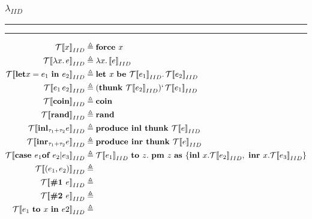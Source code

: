 \documentclass{article}
\DeclareMathOperator*\rrb{]\!]}
\begin{document}
\subsubsection*{$\lambda_{IID}$}
\hrule\hrule
\medskip
	\begin{equation*}
		\begin{split}
			\mathcal{T} [\![x{\rrb}_{IID} &\triangleq 
			\text{\bf force } x \\
			\mathcal{T} [\![\lambda x.\, e{\rrb}_{IID} &\triangleq 
			\lambda x.\, \mathcal[\![ e {\rrb}_{IID} \\
			\mathcal{T} [\![\text{\bf let} x = e_1 \text{ \bf in } e_2{\rrb}_{IID} &\triangleq 
			\text{\bf let } x \text{ \bf be } \mathcal{T}[\![e_1{\rrb}_{IID}.\, \mathcal{T}[\![e_2{\rrb}_{IID}\\
			\mathcal{T} [\![e_1\, e_2 {\rrb}_{IID} &\triangleq 
			(\text{\bf thunk } \mathcal{T}[\![e_2{\rrb}_{IID})`\, \mathcal{T}[\![e_1{\rrb}_{IID}\\
			\mathcal{T} [\![\text{\bf coin}{\rrb}_{IID} &\triangleq
			\text{\bf coin} \\
			\mathcal{T} [\![\text{\bf rand}{\rrb}_{IID} &\triangleq
			\text{\bf rand} \\
			\mathcal{T} [\![\text{\bf inl}_{\tau_1 + \tau_2} e{\rrb}_{IID} &\triangleq
			\text{\bf produce inl thunk } \mathcal{T}[\![e{\rrb}_{IID} \\
			\mathcal{T} [\![\text{\bf inr}_{\tau_1 + \tau_2} e{\rrb}_{IID} &\triangleq
			\text{\bf produce inr thunk } \mathcal{T}[\![e{\rrb}_{IID} \\
			\mathcal{T} [\![\text{\bf case } e_1 \text{\bf of } e_2 | e_3{\rrb}_{IID} &\triangleq	
			\mathcal{T}[\![ e_1{\rrb}_{IID} \text{ \bf to } z. \text{ \bf pm } z \text{ \bf as } 
			\{\text{\bf inl } x. \mathcal{T}[\![ e_2{\rrb}_{IID}, 
			\text{ \bf inr } x. \mathcal{T}[\![ e_3{\rrb}_{IID}\} \\
			\mathcal{T} [\![(e_1, e_2){\rrb}_{IID} &\triangleq \\
			\mathcal{T} [\![\text{\bf \#1 } e{\rrb}_{IID} &\triangleq \\
			\mathcal{T} [\![\text{\bf \#2 } e{\rrb}_{IID} &\triangleq \\
			\mathcal{T} [\![e_1 \text{ \bf to } x \text{ \bf in } e2{\rrb}_{IID} &\triangleq \\
		\end{split}
	\end{equation*}
	
		
\end{document}
